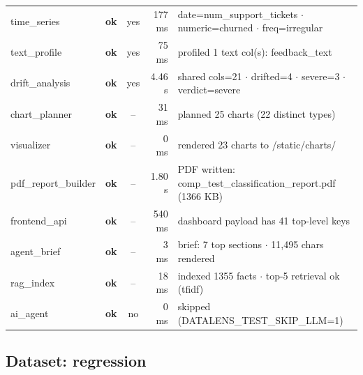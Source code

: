 \documentclass[11pt,a4paper]{article}
\begin{document}
\begin{tabularx}{\linewidth}{l c c r X}
  time\_series & \textcolor{ok}{\textbf{ok}} & \textcolor{ok}{yes} & 177 ms & date=num\_support\_tickets $\cdot$ numeric=churned $\cdot$ freq=irregular \\
  text\_profile & \textcolor{ok}{\textbf{ok}} & \textcolor{ok}{yes} & 75 ms & profiled 1 text col(s): feedback\_text \\
  drift\_analysis & \textcolor{ok}{\textbf{ok}} & \textcolor{ok}{yes} & 4.46 s & shared cols=21 $\cdot$ drifted=4 $\cdot$ severe=3 $\cdot$ verdict=severe \\
  chart\_planner & \textcolor{ok}{\textbf{ok}} & -- & 31 ms & planned 25 charts (22 distinct types) \\
  visualizer & \textcolor{ok}{\textbf{ok}} & -- & 0 ms & rendered 23 charts to /static/charts/ \\
  pdf\_report\_builder & \textcolor{ok}{\textbf{ok}} & -- & 1.80 s & PDF written: comp\_test\_classification\_report.pdf (1366 KB) \\
  frontend\_api & \textcolor{ok}{\textbf{ok}} & -- & 540 ms & dashboard payload has 41 top-level keys \\
  agent\_brief & \textcolor{ok}{\textbf{ok}} & -- & 3 ms & brief: 7 top sections $\cdot$ 11,495 chars rendered \\
  rag\_index & \textcolor{ok}{\textbf{ok}} & -- & 18 ms & indexed 1355 facts $\cdot$ top-5 retrieval ok (tfidf) \\
  ai\_agent & \textcolor{ok}{\textbf{ok}} & \textcolor{ink3}{no} & 0 ms & skipped (DATALENS\_TEST\_SKIP\_LLM=1) \\
\bottomrule
\end{tabularx}


\subsection*{Dataset: regression}
\end{document}
